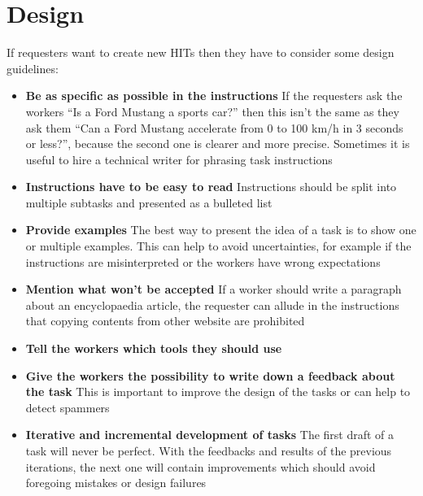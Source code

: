 \section{Design}
If requesters want to create new HITs then they have to consider some design guidelines\cite{crowdsourcing_tutorial,mturk_bestpractices}: 
\begin{itemize}
\item \textbf{Be as specific as possible in the instructions} If the requesters ask the workers ``Is a Ford Mustang a sports car?'' then this isn't the same as they ask them ``Can a Ford Mustang accelerate from 0 to 100 km/h in 3 seconds or less?'', because the second one is clearer and more precise. Sometimes it is useful to hire a technical writer for phrasing task instructions 
\item \textbf{Instructions have to be easy to read} Instructions should be split into multiple subtasks and presented as a bulleted list 
\item \textbf{Provide examples} The best way to present the idea of a task is to show one or multiple examples. This can help to avoid uncertainties, for example if the instructions are misinterpreted or the workers have wrong expectations 
\item \textbf{Mention what won't be accepted} If a worker should write a paragraph about an encyclopaedia article, the requester can allude in the instructions that copying contents from other website are prohibited
\item \textbf{Tell the workers which tools they should use} 
\item \textbf{Give the workers the possibility to write down a feedback about the task} This is important to improve the design of the tasks or can help to detect spammers 
\item \textbf{Iterative and incremental development of tasks} The first draft of a task will never be perfect. With the feedbacks and results of the previous iterations, the next one will contain improvements which should avoid foregoing mistakes or design failures
\end{itemize}


